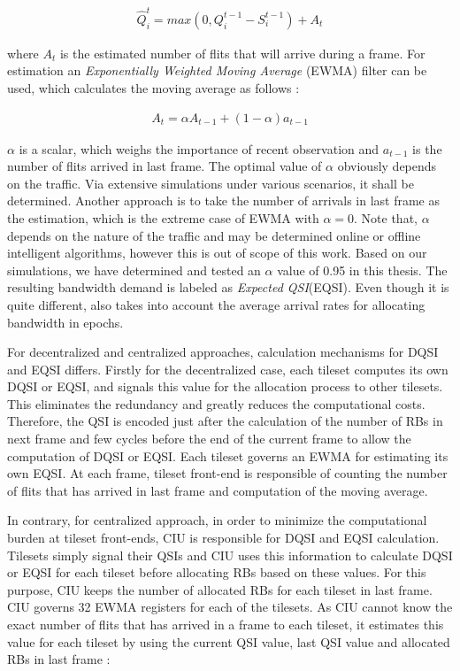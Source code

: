 \begin{align}
\hat{Q}_{i}^{t} = max(0, Q_{i}^{t-1} - S_{i}^{t-1}) + A_{t} 
\end{align} 

where $A_{t}$ is the estimated number of flits that will arrive during a frame. For estimation an \textit{Exponentially Weighted Moving Average} (EWMA) filter can be used, which calculates the moving average as follows :

\begin{align}
A_{t} = \alpha A_{t-1} + (1 - \alpha)a_{t-1}
\end{align} 

$\alpha$ is a scalar, which weighs the importance of recent observation and $a_{t-1}$ is the number of flits arrived in last frame. The optimal value of $\alpha$ obviously depends on the traffic. Via extensive simulations under various scenarios, it shall be determined. Another approach is to take the number of arrivals in last frame as the estimation, which is the extreme case of EWMA with $\alpha = 0$. Note that, $\alpha$ depends on the nature of the traffic and may be determined online or offline intelligent algorithms, however this is out of scope of this work. Based on our simulations, we have determined and tested an $\alpha$ value of 0.95 in this thesis.  The resulting bandwidth demand is labeled as \textit{Expected QSI}(EQSI). Even though it is quite different, \cite{rizk2015queue} also takes into account the average arrival rates for allocating bandwidth in epochs.  

For decentralized and centralized approaches, calculation mechanisms for DQSI and EQSI differs. Firstly for the decentralized case, each tileset computes its own DQSI or EQSI, and signals this value for the allocation process to other tilesets. This eliminates the redundancy and greatly reduces the computational costs. Therefore, the QSI is encoded just after the calculation of the number of RBs in next frame and few cycles before the end of the current frame to allow the computation of DQSI or EQSI. Each tileset governs an EWMA for estimating its own EQSI. At each frame, tileset front-end is responsible of counting the number of flits that has arrived in last frame and computation of the moving average.

In contrary, for centralized approach, in order to minimize the computational burden at tileset front-ends, CIU is responsible for DQSI and EQSI calculation. Tilesets simply signal their QSIs and CIU uses this information to calculate DQSI or EQSI for each tileset before allocating RBs based on these values. For this purpose, CIU keeps the number of allocated RBs for each tileset in last frame. CIU governs 32 EWMA registers for each of the tilesets. As CIU cannot know the exact number of flits that has arrived in a frame to each tileset, it estimates this value for each tileset by using the current QSI value, last QSI value and allocated RBs in last frame :


